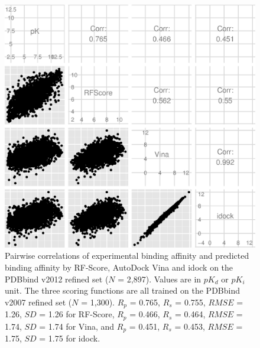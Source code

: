 \begin{figure}
\begin{center}
\includegraphics[width=\linewidth]{../istar/PDBbind2012Correlations.eps}
\end{center}
\caption{Pairwise correlations of experimental binding affinity and predicted binding affinity by RF-Score, AutoDock Vina and idock on the PDBbind v2012 refined set ($N$ = 2,897). Values are in $pK_d$ or $pK_i$ unit. The three scoring functions are all trained on the PDBbind v2007 refined set ($N$ = 1,300). $R_p$ = 0.765, $R_s$ = 0.755, $RMSE$ = 1.26, $SD$ = 1.26 for RF-Score, $R_p$ = 0.466, $R_s$ = 0.464, $RMSE$ = 1.74, $SD$ = 1.74 for Vina, and $R_p$ = 0.451, $R_s$ = 0.453, $RMSE$ = 1.75, $SD$ = 1.75 for idock.}
\label{istar:PDBbind2012Correlations}
\end{figure}

